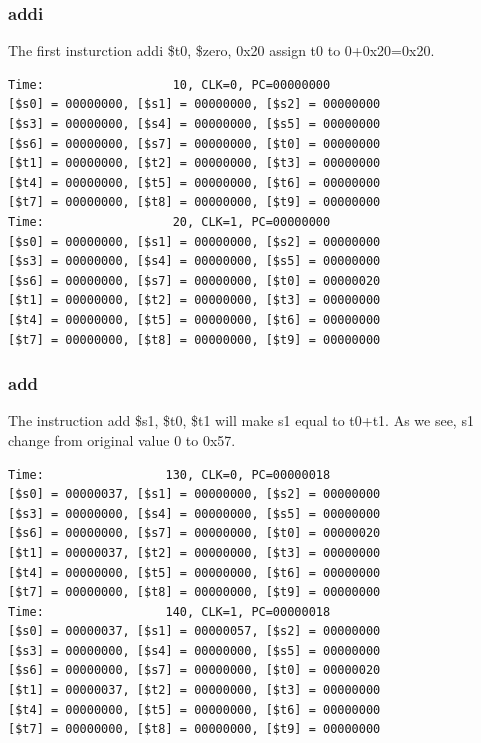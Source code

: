 \documentclass[a4paper,12pt]{article}
\begin{document}
\subsubsection{addi}
\par The first insturction addi \$t0, \$zero, 0x20 assign t0 to 0+0x20=0x20.

\begin{lstlisting}
Time:                  10, CLK=0, PC=00000000
[$s0] = 00000000, [$s1] = 00000000, [$s2] = 00000000
[$s3] = 00000000, [$s4] = 00000000, [$s5] = 00000000
[$s6] = 00000000, [$s7] = 00000000, [$t0] = 00000000
[$t1] = 00000000, [$t2] = 00000000, [$t3] = 00000000
[$t4] = 00000000, [$t5] = 00000000, [$t6] = 00000000
[$t7] = 00000000, [$t8] = 00000000, [$t9] = 00000000
Time:                  20, CLK=1, PC=00000000
[$s0] = 00000000, [$s1] = 00000000, [$s2] = 00000000
[$s3] = 00000000, [$s4] = 00000000, [$s5] = 00000000
[$s6] = 00000000, [$s7] = 00000000, [$t0] = 00000020
[$t1] = 00000000, [$t2] = 00000000, [$t3] = 00000000
[$t4] = 00000000, [$t5] = 00000000, [$t6] = 00000000
[$t7] = 00000000, [$t8] = 00000000, [$t9] = 00000000
\end{lstlisting}

\subsubsection{add}
\par The instruction add \$s1, \$t0, \$t1 will make s1 equal to t0+t1. As we see, s1 change from original value 0 to 0x57.

\begin{lstlisting}
Time:                 130, CLK=0, PC=00000018
[$s0] = 00000037, [$s1] = 00000000, [$s2] = 00000000
[$s3] = 00000000, [$s4] = 00000000, [$s5] = 00000000
[$s6] = 00000000, [$s7] = 00000000, [$t0] = 00000020
[$t1] = 00000037, [$t2] = 00000000, [$t3] = 00000000
[$t4] = 00000000, [$t5] = 00000000, [$t6] = 00000000
[$t7] = 00000000, [$t8] = 00000000, [$t9] = 00000000
Time:                 140, CLK=1, PC=00000018
[$s0] = 00000037, [$s1] = 00000057, [$s2] = 00000000
[$s3] = 00000000, [$s4] = 00000000, [$s5] = 00000000
[$s6] = 00000000, [$s7] = 00000000, [$t0] = 00000020
[$t1] = 00000037, [$t2] = 00000000, [$t3] = 00000000
[$t4] = 00000000, [$t5] = 00000000, [$t6] = 00000000
[$t7] = 00000000, [$t8] = 00000000, [$t9] = 00000000
\end{lstlisting}
\end{document}
